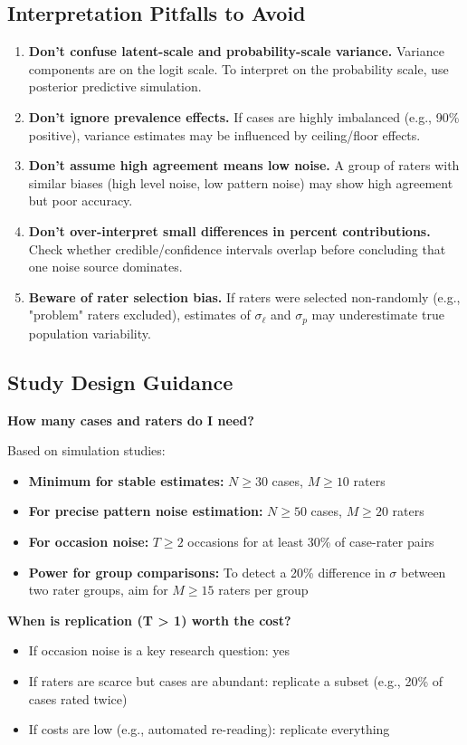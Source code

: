 \subsection*{Interpretation Pitfalls to Avoid}

\begin{enumerate}
    \item \textbf{Don't confuse latent-scale and probability-scale variance.} Variance components are on the logit scale. To interpret on the probability scale, use posterior predictive simulation.

    \item \textbf{Don't ignore prevalence effects.} If cases are highly imbalanced (e.g., 90\% positive), variance estimates may be influenced by ceiling/floor effects.

    \item \textbf{Don't assume high agreement means low noise.} A group of raters with similar biases (high level noise, low pattern noise) may show high agreement but poor accuracy.

    \item \textbf{Don't over-interpret small differences in percent contributions.} Check whether credible/confidence intervals overlap before concluding that one noise source dominates.

    \item \textbf{Beware of rater selection bias.} If raters were selected non-randomly (e.g., "problem" raters excluded), estimates of $\sigma_\ell$ and $\sigma_p$ may underestimate true population variability.
\end{enumerate}

\subsection*{Study Design Guidance}

\textbf{How many cases and raters do I need?}

Based on simulation studies: 
\begin{itemize}
    \item \textbf{Minimum for stable estimates:} $N \geq 30$ cases, $M \geq 10$ raters
    \item \textbf{For precise pattern noise estimation:} $N \geq 50$ cases, $M \geq 20$ raters
    \item \textbf{For occasion noise:} $T \geq 2$ occasions for at least 30\% of case-rater pairs
    \item \textbf{Power for group comparisons:} To detect a 20\% difference in $\sigma$ between two rater groups, aim for $M \geq 15$ raters per group
\end{itemize}

\textbf{When is replication (T > 1) worth the cost?}
\begin{itemize}
    \item If occasion noise is a key research question: yes
    \item If raters are scarce but cases are abundant: replicate a subset (e.g., 20\% of cases rated twice)
    \item If costs are low (e.g., automated re-reading): replicate everything
\end{itemize}

